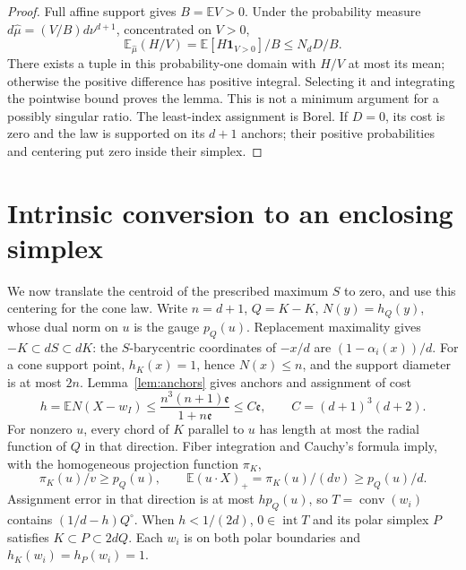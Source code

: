 \documentclass[11pt]{article}
\newcommand{\conv}{\operatorname{conv}}
\newcommand{\ee}{\mathfrak e}
\newcommand{\E}{\mathbb E}
\begin{document}
\begin{proof}
Full affine support gives $B=\E V>0$. Under the probability measure
$d\widehat\mu=(V/B)d\nu^{d+1}$, concentrated on $V>0$,
\[
\E_{\widehat\mu}(H/V)=\E[H\mathbf1_{V>0}]/B\le N_dD/B.
\]
There exists a tuple in this probability-one domain with $H/V$ at most its
mean; otherwise the positive difference has positive integral. Selecting it
and integrating the pointwise bound proves the lemma. This is not a minimum
argument for a possibly singular ratio. The least-index assignment is Borel.
If $D=0$, its cost is zero and the law is supported on its $d+1$ anchors;
their positive probabilities and centering put zero inside their simplex.
\end{proof}

\section{Intrinsic conversion to an enclosing simplex}
We now translate the centroid of the prescribed maximum $S$ to zero, and use
this centering for the cone law. Write $n=d+1$, $Q=K-K$, $N(y)=h_Q(y)$,
whose dual norm on $u$ is the gauge $p_Q(u)$. Replacement maximality gives
$-K\subset dS\subset dK$: the $S$-barycentric coordinates of $-x/d$ are
$(1-\alpha_i(x))/d$. For a cone support point, $h_K(x)=1$, hence
$N(x)\le n$, and the support diameter is at most $2n$.
Lemma~\ref{lem:anchors} gives anchors and assignment of cost
\[
h=\E N(X-w_I)\le\frac{n^3(n+1)\ee}{1+n\ee}\le C\ee,
\qquad C=(d+1)^3(d+2).
\]
For nonzero $u$, every chord of $K$ parallel to $u$ has length at most the
radial function of $Q$ in that direction. Fiber integration and Cauchy's
formula imply, with the homogeneous projection function $\pi_K$,
\[
\pi_K(u)/v\ge p_Q(u),\qquad \E(u\cdot X)_+=\pi_K(u)/(dv)\ge p_Q(u)/d.
\]
Assignment error in that direction is at most $h p_Q(u)$, so
$T=\conv(w_i)$ contains $(1/d-h)Q^\circ$.
When $h<1/(2d)$, $0\in\operatorname{int}T$ and its polar simplex $P$ satisfies
$K\subset P\subset2dQ$. Each $w_i$ is on both polar boundaries and
$h_K(w_i)=h_P(w_i)=1$.
\end{document}
